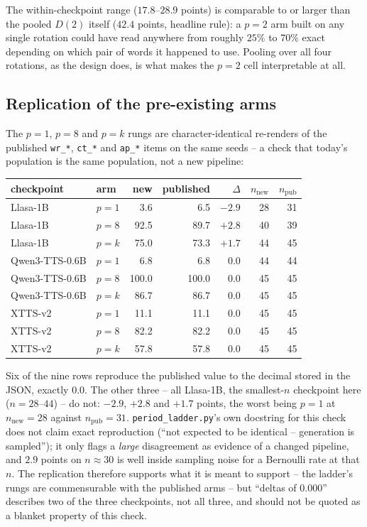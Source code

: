 \documentclass[11pt]{article}
\begin{document}
\noindent The within-checkpoint range ($17.8$--$28.9$ points) is comparable
to or larger than the pooled $D(2)$ itself ($42.4$ points, headline rule):
a $p=2$ arm built on any single rotation could have read anywhere from
roughly $25\%$ to $70\%$ exact depending on which pair of words it happened
to use. Pooling over all four rotations, as the design does, is what makes
the $p=2$ cell interpretable at all.

\subsection{Replication of the pre-existing arms}

The $p=1$, $p=8$ and $p=k$ rungs are character-identical re-renders of the
published \texttt{wr\_*}, \texttt{ct\_*} and \texttt{ap\_*} items on the same
seeds -- a check that today's population is the same population, not a new
pipeline:

\begin{center}
\begin{tabular}{@{}llrrrrr@{}}
\toprule
checkpoint & arm & new & published & $\Delta$ & $n_{\text{new}}$ & $n_{\text{pub}}$ \\
\midrule
Llasa-1B         & $p{=}1$ &  3.6 &  6.5 & $-2.9$ & 28 & 31 \\
Llasa-1B         & $p{=}8$ & 92.5 & 89.7 & $+2.8$ & 40 & 39 \\
Llasa-1B         & $p{=}k$ & 75.0 & 73.3 & $+1.7$ & 44 & 45 \\
Qwen3-TTS-0.6B   & $p{=}1$ &  6.8 &  6.8 &  0.0   & 44 & 44 \\
Qwen3-TTS-0.6B   & $p{=}8$ &100.0 &100.0 &  0.0   & 45 & 45 \\
Qwen3-TTS-0.6B   & $p{=}k$ & 86.7 & 86.7 &  0.0   & 45 & 45 \\
XTTS-v2          & $p{=}1$ & 11.1 & 11.1 &  0.0   & 45 & 45 \\
XTTS-v2          & $p{=}8$ & 82.2 & 82.2 &  0.0   & 45 & 45 \\
XTTS-v2          & $p{=}k$ & 57.8 & 57.8 &  0.0   & 45 & 45 \\
\bottomrule
\end{tabular}
\end{center}

\noindent Six of the nine rows reproduce the published value to the decimal
stored in the JSON, exactly $0.0$. The other three -- all Llasa-1B, the
smallest-$n$ checkpoint here ($n=28$--$44$) -- do not: $-2.9$, $+2.8$ and
$+1.7$ points, the worst being $p{=}1$ at $n_{\text{new}}=28$ against
$n_{\text{pub}}=31$. \texttt{period\_ladder.py}'s own docstring for this
check does not claim exact reproduction (``not expected to be identical --
generation is sampled''); it only flags a \emph{large} disagreement as
evidence of a changed pipeline, and $2.9$ points on $n\approx30$ is well
inside sampling noise for a Bernoulli rate at that $n$. The replication
therefore supports what it is meant to support -- the ladder's rungs are
commensurable with the published arms -- but ``deltas of $0.000$'' describes
two of the three checkpoints, not all three, and should not be quoted as a
blanket property of this check.
\end{document}
